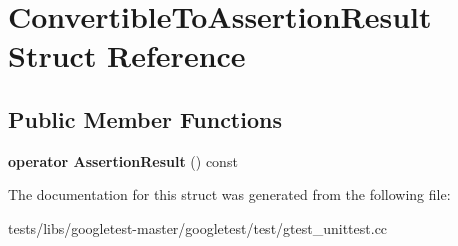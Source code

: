 \hypertarget{structConvertibleToAssertionResult}{}\section{Convertible\+To\+Assertion\+Result Struct Reference}
\label{structConvertibleToAssertionResult}
\subsection*{Public Member Functions}
\begin{DoxyCompactItemize}
\item 
\mbox{\label{structConvertibleToAssertionResult_a0f816f2f25ecaf29a95b3cfd4033e105}} 
{\bfseries operator Assertion\+Result} () const
\end{DoxyCompactItemize}


The documentation for this struct was generated from the following file\+:\begin{DoxyCompactItemize}
\item 
tests/libs/googletest-\/master/googletest/test/gtest\+\_\+unittest.\+cc\end{DoxyCompactItemize}
